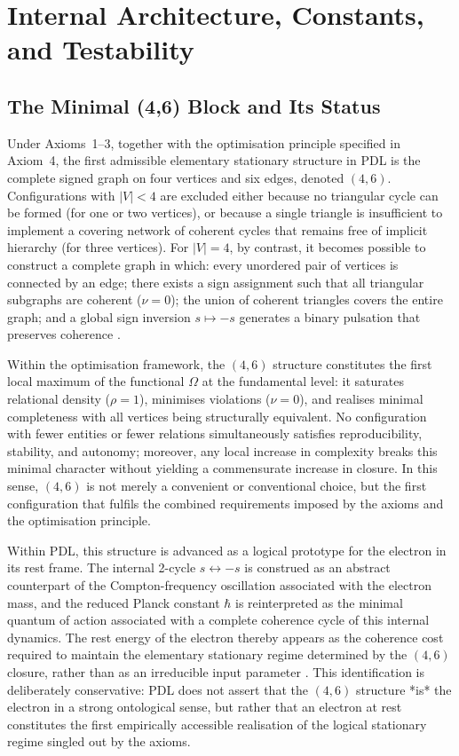 \documentclass[11pt,a4paper]{article}
\begin{document}
\section{Internal Architecture, Constants, and Testability}

\subsection{The Minimal (4,6) Block and Its Status}

Under Axioms~1–3, together with the optimisation principle specified in Axiom~4, the first admissible elementary stationary structure in PDL is the complete signed graph on four vertices and six edges, denoted \((4,6)\). Configurations with \(|V| < 4\) are excluded either because no triangular cycle can be formed (for one or two vertices), or because a single triangle is insufficient to implement a covering network of coherent cycles that remains free of implicit hierarchy (for three vertices). For \(|V| = 4\), by contrast, it becomes possible to construct a complete graph in which: every unordered pair of vertices is connected by an edge; there exists a sign assignment such that all triangular subgraphs are coherent (\(\nu = 0\)); the union of coherent triangles covers the entire graph; and a global sign inversion \(s \mapsto -s\) generates a binary pulsation that preserves coherence \cite{Laubscher_LDP_fr,Laubscher_PDL_IMRad}.  

Within the optimisation framework, the \((4,6)\) structure constitutes the first local maximum of the functional \(\Omega\) at the fundamental level: it saturates relational density (\(\rho = 1\)), minimises violations (\(\nu = 0\)), and realises minimal completeness with all vertices being structurally equivalent. No configuration with fewer entities or fewer relations simultaneously satisfies reproducibility, stability, and autonomy; moreover, any local increase in complexity breaks this minimal character without yielding a commensurate increase in closure. In this sense, \((4,6)\) is not merely a convenient or conventional choice, but the first configuration that fulfils the combined requirements imposed by the axioms and the optimisation principle. 

Within PDL, this structure is advanced as a logical prototype for the electron in its rest frame. The internal 2-cycle \(s \leftrightarrow -s\) is construed as an abstract counterpart of the Compton-frequency oscillation associated with the electron mass, and the reduced Planck constant \(\hbar\) is reinterpreted as the minimal quantum of action associated with a complete coherence cycle of this internal dynamics. The rest energy of the electron thereby appears as the coherence cost required to maintain the elementary stationary regime determined by the \((4,6)\) closure, rather than as an irreducible input parameter \cite{Laubscher_PDL_long}. This identification is deliberately conservative: PDL does not assert that the \((4,6)\) structure *is* the electron in a strong ontological sense, but rather that an electron at rest constitutes the first empirically accessible realisation of the logical stationary regime singled out by the axioms.  
\end{document}
